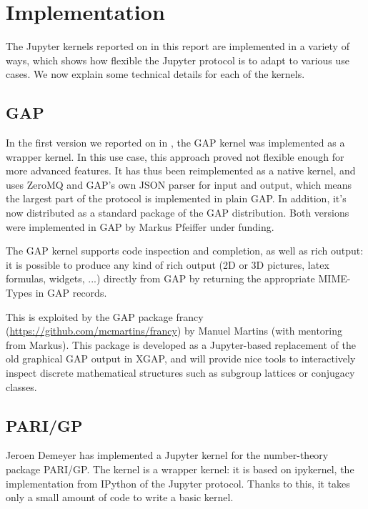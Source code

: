 \documentclass{deliverablereport}
\begin{document}

\section{Implementation}

The Jupyter kernels reported on in this report are implemented in a variety of ways, which shows how flexible
the Jupyter protocol is to adapt to various use cases. We now explain some technical details for each of the kernels.

\subsection{GAP}

In the first version we reported on in
, the GAP kernel was implemented as
a wrapper kernel. In this use case, this approach proved not flexible
enough for more advanced features. It has thus been reimplemented as a
native kernel, and uses ZeroMQ and GAP's own JSON parser for input and
output, which means the largest part of the protocol is implemented in
plain GAP. In addition, it's now distributed as a standard package of
the GAP distribution. Both versions were implemented in GAP by Markus
Pfeiffer under \ODK funding.

The GAP kernel supports code inspection and completion, as well as
rich output: it is possible to produce any kind of rich output (2D or
3D pictures, latex formulas, widgets, ...) directly from GAP by
returning the appropriate MIME-Types in GAP records.

This is exploited by the GAP package francy
(\url{https://github.com/mcmartins/francy}) by Manuel Martins (with
mentoring from Markus). This package is developed as a Jupyter-based
replacement of the old graphical GAP output in XGAP, and will provide
nice tools to interactively inspect discrete mathematical structures
such as subgroup lattices or conjugacy classes.

\subsection{PARI/GP}

Jeroen Demeyer has implemented a Jupyter kernel for the number-theory package PARI/GP.
The kernel is a wrapper kernel:
it is based on ipykernel, the implementation from IPython of the Jupyter protocol.
Thanks to this, it takes only a small amount of code to write a basic kernel.
\end{document}
